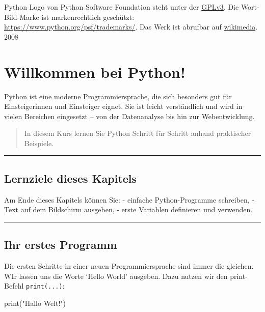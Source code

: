\documentclass[
  letterpaper,
  DIV=11,
  numbers=noendperiod]{scrreprt}
\newenvironment{Shaded}{\begin{snugshade}}{\end{snugshade}}
\newcommand{\BuiltInTok}[1]{\textcolor[rgb]{0.00,0.23,0.31}{#1}}
\newcommand{\NormalTok}[1]{\textcolor[rgb]{0.00,0.23,0.31}{#1}}
\newcommand{\StringTok}[1]{\textcolor[rgb]{0.13,0.47,0.30}{#1}}
\begin{document}
Python Logo von Python Software Foundation steht unter der
\href{https://www.gnu.org/licenses/gpl-3.0.html}{GPLv3}. Die
Wort-Bild-Marke ist markenrechtlich geschützt:
\url{https://www.python.org/psf/trademarks/}. Das Werk ist abrufbar auf
\href{https://de.m.wikipedia.org/wiki/Datei:Python_logo_and_wordmark.svg}{wikimedia}.
2008

\chapter{Willkommen bei Python!}\label{willkommen-bei-python}

Python ist eine moderne Programmiersprache, die sich besonders gut für
Einsteigerinnen und Einsteiger eignet. Sie ist leicht verständlich und
wird in vielen Bereichen eingesetzt -- von der Datenanalyse bis hin zur
Webentwicklung.

\begin{quote}
In diesem Kurs lernen Sie Python Schritt für Schritt anhand praktischer
Beispiele.
\end{quote}

\begin{center}\rule{0.5\linewidth}{0.5pt}\end{center}

\section{Lernziele dieses Kapitels}\label{lernziele-dieses-kapitels}

Am Ende dieses Kapitels können Sie: - einfache Python-Programme
schreiben, - Text auf dem Bildschirm ausgeben, - erste Variablen
definieren und verwenden.

\begin{center}\rule{0.5\linewidth}{0.5pt}\end{center}

\section{Ihr erstes Programm}\label{ihr-erstes-programm}

Die ersten Schritte in einer neuen Programmiersprache sind immer die
gleichen. WIr lassen uns die Worte `Hello World' ausgeben. Dazu nutzen
wir den print-Befehl \texttt{print(...)}:

\begin{Shaded}
\begin{Highlighting}[]
\BuiltInTok{print}\NormalTok{(}\StringTok{"Hallo Welt!"}\NormalTok{)}
\end{Highlighting}
\end{Shaded}
\end{document}
